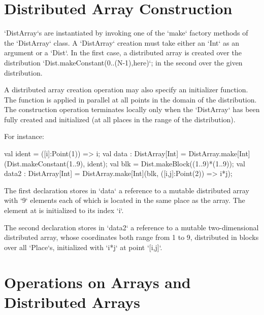 \section{Distributed Array Construction}\label{ArrayInitializer}

\xcd`DistArray`s are instantiated by invoking one of the \xcd`make` factory
methods of the \xcd`DistArray` class.
A \xcd`DistArray` creation 
must take either an \xcd`Int` as an argument or a \xcd`Dist`. In the first
case,  a distributed array is created over the distribution 
\xcd`Dist.makeConstant(0..(N-1),here)`;
in the second over the given distribution. 

\begin{ex}A distributed array creation operation may also specify an initializer
function.
The function is applied in parallel
at all points in the domain of the distribution. The
construction operation terminates locally only when the \xcd`DistArray` has been
fully created and initialized (at all places in the range of the
distribution).

For instance:
\begin{xten}
val ident = ([i]:Point(1)) => i;
val data : DistArray[Int]
    = DistArray.make[Int](Dist.makeConstant(1..9), ident);
val blk = Dist.makeBlock((1..9)*(1..9));
val data2 : DistArray[Int]
    = DistArray.make[Int](blk, ([i,j]:Point(2)) => i*j);
\end{xten}




{}\noindent 
The first declaration stores in \xcd`data` a reference to a mutable
distributed array with \xcd`9` elements each of which is located in the
same place as the array. The element at \Xcd{[i]} is initialized to its index
\xcd`i`. 

The second declaration stores in \xcd`data2` a reference to a mutable
two-dimensional distributed array, whose coordinates both range from 1 to
9, distributed in blocks over all \xcd`Place`s, 
initialized with \xcd`i*j`
at point \xcd`[i,j]`.
\end{ex}


\section{Operations on Arrays and Distributed Arrays}

